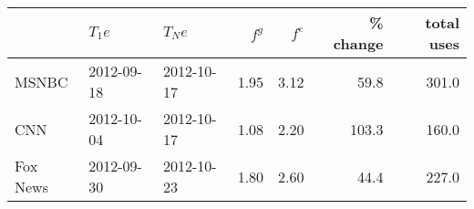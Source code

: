 \begin{tabular}{lllrrrr}
\toprule
{} &     $T_1e$ &     $T_Ne$ & $f^g$ & $f^e$ & \% change &  total uses \\
\midrule
MSNBC    & 2012-09-18 & 2012-10-17 &  1.95 &  3.12 &      59.8 &       301.0 \\
CNN      & 2012-10-04 & 2012-10-17 &  1.08 &  2.20 &     103.3 &       160.0 \\
Fox News & 2012-09-30 & 2012-10-23 &  1.80 &  2.60 &      44.4 &       227.0 \\
\bottomrule
\end{tabular}
